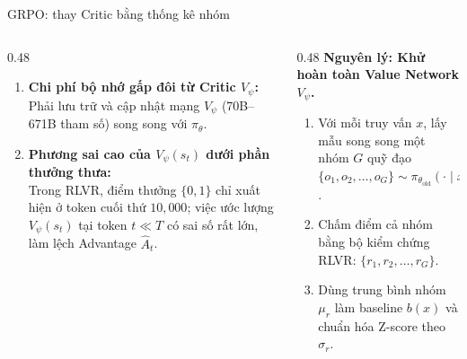 \begin{frame}{GRPO: thay Critic bằng thống kê nhóm}
  \begin{columns}[T,onlytextwidth]
    \begin{column}{0.48\textwidth}
      \small
      \begin{enumerate}\setlength{\itemsep}{4pt}
        \item \textbf{Chi phí bộ nhớ gấp đôi từ Critic $V_\psi$:}\\
          Phải lưu trữ và cập nhật mạng $V_\psi$ (70B--671B tham số) song song với $\pi_\theta$.
        \item \textbf{Phương sai cao của $V_\psi(s_t)$ dưới phần thưởng thưa:}\\
          Trong RLVR, điểm thưởng $\{0, 1\}$ chỉ xuất hiện ở token cuối thứ $10{,}000$; việc ước lượng $V_\psi(s_t)$ tại token $t \ll T$ có sai số rất lớn, làm lệch Advantage $\hat{A}_t$.
      \end{enumerate}
    \end{column}
    \begin{column}{0.48\textwidth}
      \small
      \textbf{Nguyên lý: Khử hoàn toàn Value Network $V_\psi$.}
      \vspace{0.04cm}
      \begin{enumerate}\setlength{\itemsep}{4pt}
        \item Với mỗi truy vấn $x$, lấy mẫu song song một nhóm $G$ quỹ đạo $\{o_1, o_2, \dots, o_G\} \sim \pi_{\theta_{\text{old}}}(\cdot \mid x)$.
        \item Chấm điểm cả nhóm bằng bộ kiểm chứng RLVR: $\{r_1, r_2, \dots, r_G\}$.
        \item Dùng trung bình nhóm $\mu_r$ làm baseline $b(x)$ và chuẩn hóa Z-score theo $\sigma_r$.
      \end{enumerate}
    \end{column}
  \end{columns}
  \par\vspace{0pt}
\end{frame}

